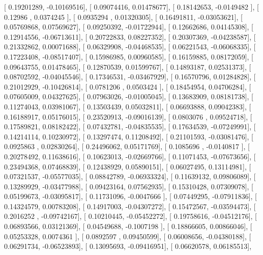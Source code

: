 \documentclass{article}
\begin{document}
       [ 0.19201289, -0.10169516],
       [ 0.09074416,  0.01478677],
       [ 0.18142653, -0.0149482 ],
       [ 0.12986   ,  0.0374245 ],
       [ 0.0935294 ,  0.01320305],
       [ 0.16491811, -0.03053621],
       [ 0.05769868,  0.07569627],
       [ 0.09250392, -0.01722944],
       [ 0.12662686,  0.04145308],
       [ 0.12914556, -0.06713611],
       [ 0.20722833,  0.08227352],
       [ 0.20307369, -0.04238587],
       [ 0.21332862,  0.00071688],
       [ 0.06329908, -0.04468535],
       [ 0.06221543, -0.06068335],
       [ 0.17223408, -0.08517407],
       [ 0.15986985,  0.00960585],
       [ 0.16159885,  0.08172059],
       [ 0.09643755,  0.01478465],
       [ 0.12870539,  0.01599767],
       [ 0.14893187,  0.02531373],
       [ 0.08702592, -0.04045546],
       [ 0.17346531, -0.03467929],
       [ 0.16570796,  0.01284828],
       [ 0.21012929, -0.10426814],
       [ 0.0781206 ,  0.0503424 ],
       [ 0.18454954,  0.04706284],
       [ 0.07605009,  0.04327625],
       [ 0.07963026, -0.01005045],
       [ 0.13683909,  0.08181738],
       [ 0.11274043,  0.03981067],
       [ 0.13503439,  0.05032811],
       [ 0.06693888,  0.09042383],
       [ 0.16188917,  0.05176015],
       [ 0.23520913, -0.09016139],
       [ 0.0803076 ,  0.09524718],
       [ 0.17589821,  0.08182422],
       [ 0.07432781, -0.04835535],
       [ 0.17634539, -0.07249991],
       [ 0.14214114,  0.10230972],
       [ 0.13297474,  0.11208492],
       [ 0.21101593, -0.03081476],
       [ 0.0925863 ,  0.02830264],
       [ 0.24496062,  0.05171769],
       [ 0.1085696 , -0.0140817 ],
       [ 0.20278492,  0.11638616],
       [ 0.10623013, -0.02669766],
       [ 0.11071453, -0.07673656],
       [ 0.23494368,  0.07468839],
       [ 0.12438929,  0.05890151],
       [ 0.06027495,  0.13114981],
       [ 0.07321537, -0.05577035],
       [ 0.08842789, -0.06933324],
       [ 0.11639132,  0.09806089],
       [ 0.13289929, -0.03477988],
       [ 0.09423164,  0.07562935],
       [ 0.15310428,  0.07309078],
       [ 0.05199673, -0.03095817],
       [ 0.11731096, -0.0047666 ],
       [ 0.07449295, -0.07911836],
       [ 0.14324579,  0.00783208],
       [ 0.14917003, -0.04307272],
       [ 0.15472567, -0.03594473],
       [ 0.2016252 , -0.09742167],
       [ 0.10210445, -0.05452272],
       [ 0.19758616, -0.04512176],
       [ 0.06893566,  0.03121369],
       [ 0.04549688, -0.1007198 ],
       [ 0.18866605,  0.00866046],
       [ 0.05253328,  0.0074361 ],
       [ 0.0892597 ,  0.09450599],
       [ 0.06008656, -0.04380188],
       [ 0.06291734, -0.06523893],
       [ 0.13095693, -0.09416951],
       [ 0.06620578,  0.06185513],
\end{document}
